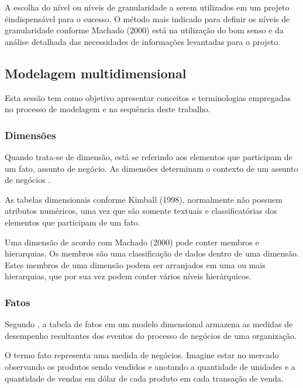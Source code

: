 A escolha do n\'{i}vel ou n\'{i}veis de granularidade a serem utilizados em um projeto \'{e}indispens\'{a}vel para o sucesso. O m\'{e}todo mais indicado para definir os n\'{i}veis de granularidade conforme Machado (2000) est\'{a} na utiliza\c{c}\~{a}o do bom senso e da an\'{a}lise detalhada das necessidades de informa\c{c}\~{o}es levantadas para o projeto.
	
\subsection{Modelagem multidimensional}

Esta sess\~{a}o tem como objetivo apresentar conceitos e terminologias empregadas no processo de modelagem e na sequência deste trabalho. 

\subsubsection{Dimens\~{o}es}

Quando trata-se de dimens\~{a}o, est\'{a} se referindo aos elementos que participam de um fato, assunto de neg\'{o}cio. As dimens\~{o}es determinam o contexto de um assunto de neg\'{o}cios \cite{bi-machado-2018}.

As tabelas dimensionais conforme Kimball (1998), normalmente n\~{a}o possuem atributos num\'{e}ricos, uma vez que s\~{a}o somente textuais e classificat\'{o}rias dos elementos que participam de um fato.

Uma dimens\~{a}o de acordo com Machado (2000) pode conter membros e hierarquias. Os membros s\~{a}o uma classifica\c{c}\~{a}o de dados dentro de uma dimens\~{a}o. Estes membros de uma dimens\~{a}o podem ser arranjados em uma ou mais hierarquias, que por sua vez podem conter v\'{a}rios n\'{i}veis hier\'{a}rquicos.

\subsubsection{Fatos}

Segundo \cite{dw-kimball-2013}, a tabela de fatos em um modelo dimensional armazena as medidas de desempenho resultantes dos eventos do processo de neg\'{o}cios de uma organiza\c{c}\~{a}o.

O termo fato representa uma medida de neg\'{o}cios. Imagine estar no mercado observando os produtos sendo vendidos e anotando a quantidade de unidades e a quantidade de vendas em d\'{o}lar de cada produto em cada transa\c{c}\~{a}o de venda. 

